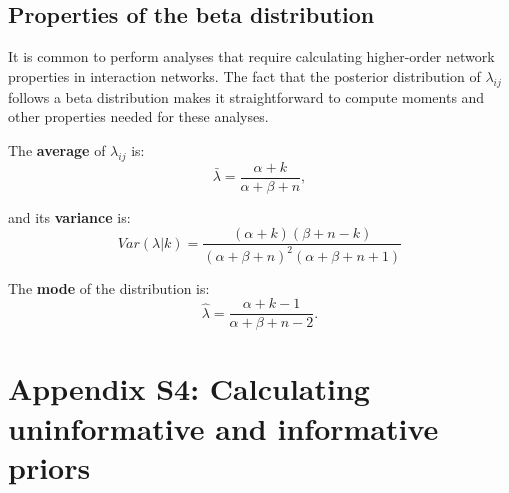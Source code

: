 \documentclass[12pt]{article}
\begin{document}
  \subsection*{Properties of the beta distribution}
  
      It is common to perform analyses that require calculating higher-order network properties in interaction networks. The fact that the posterior distribution of $\lambda_{ij}$ follows a beta distribution makes it straightforward to compute moments and other properties needed for these analyses. 


      The \textbf{average} of $\lambda_{ij}$ is: 
          \begin{equation}
            \bar{\lambda} = \frac{\alpha+k}{\alpha+\beta+n} ,
            \label{mean}
          \end{equation}

        and its \textbf{variance} is:  
          \begin{equation}
            Var(\lambda|k) = \frac{(\alpha + k)(\beta + n - k)}{(\alpha + \beta + n)^{2}(\alpha + \beta + n +1)}
            \label{variance}
          \end{equation}

        The \textbf{mode} of the distribution is:
          \begin{equation}
            \hat{\lambda} = \frac{\alpha + k - 1}{\alpha + \beta + n - 2} .
            \label{mode}
          \end{equation}


\clearpage

\section*{Appendix S4: Calculating uninformative and informative priors}
\end{document}
